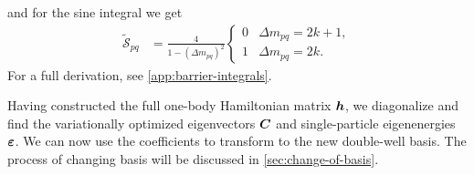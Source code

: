         and for the sine integral we get
        \begin{align}
            \tilde{\mathcal{S}}_{pq}
            &=
            \frac{4}{1 - (\Delta m_{pq})^2}
            \begin{cases}
                0 & \Delta m_{pq} = 2k + 1, \\
                1 & \Delta m_{pq} = 2k.
            \end{cases}
        \end{align}
        For a full derivation, see \autoref{app:barrier-integrals}.

        Having constructed the full one-body Hamiltonian matrix $\boldsymbol{h}$, we
        diagonalize and find the variationally optimized eigenvectors $\boldsymbol{C}$
        and single-particle eigenenergies $\boldsymbol{\varepsilon}$.
        We can now use the coefficients to transform to the new double-well
        basis.
        The process of changing basis will be discussed in
        \autoref{sec:change-of-basis}.
